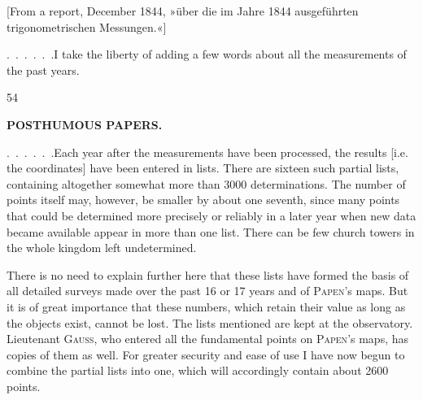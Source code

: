 \par\medskip
\begin{center}
[From a report, December 1844, »über die im Jahre 1844 ausgeführten\\
trigonometrischen Messungen.«]
\end{center}

\par\noindent\hspace*{\parindent}\mbox{.\ .\ .\ .\ .\ .}\quad I take the liberty of adding a few words about all the measurements of the past years.

\par\smallskip\noindent\hspace*{.03\linewidth}{\footnotesize IX.}\hfill{\footnotesize 54}\hspace*{.12\linewidth}\par

\par\clearpage
\noindent{}\hfill{\small\textbf{POSTHUMOUS PAPERS.}}\hfill\null\par\medskip

\par\noindent\hspace*{\parindent}\mbox{.\ .\ .\ .\ .\ .}\quad Each year after the measurements have been processed, the results [i.e. the coordinates] have been entered in lists. There are sixteen such partial lists, containing altogether somewhat more than 3000 determinations. The number of points itself may, however, be smaller by about one seventh, since many points that could be determined more precisely or reliably in a later year when new data became available appear in more than one list. There can be few church towers in the whole kingdom left undetermined.

\par\noindent\hspace*{\parindent}There is no need to explain further here that these lists have formed the basis of all detailed surveys made over the past 16 or 17 years and of \textsc{Papen}'s maps. But it is of great importance that these numbers, which retain their value as long as the objects exist, cannot be lost. The lists mentioned are kept at the observatory. Lieutenant \textsc{Gauss}, who entered all the fundamental points on \textsc{Papen}'s maps, has copies of them as well. For greater security and ease of use I have now begun to combine the partial lists into one, which will accordingly contain about 2600 points.

